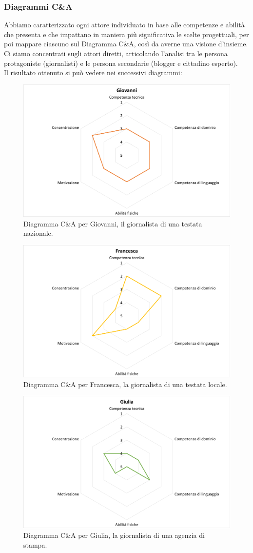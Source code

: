 \subsubsection{Diagrammi C\&A}
\label{sss:diagrammi-c_and_a}
Abbiamo caratterizzato ogni attore individuato in base alle competenze e abilità che presenta e che impattano in maniera più significativa le scelte progettuali, per poi mappare ciascuno sul Diagramma C\&A, così da averne una visione d'insieme.
Ci siamo concentrati sugli attori diretti, articolando l'analisi tra le persona protagoniste (giornalisti) e le persona secondarie (blogger e cittadino esperto).\\
Il risultato ottenuto si può vedere nei successivi diagrammi:
\begin{figure}[H]
    \centering
    \includegraphics[width=0.5\columnwidth]{assets/images/proposta-design/caos/giovanni}
    \caption{Diagramma C\&A per Giovanni, il giornalista di una testata nazionale.}
\end{figure}

\begin{figure}[H]
    \centering
    \includegraphics[width=0.5\columnwidth]{assets/images/proposta-design/caos/francesca}
    \caption{Diagramma C\&A per Francesca, la giornalista di una testata locale.}
\end{figure}

\begin{figure}[H]
    \centering
    \includegraphics[width=0.5\columnwidth]{assets/images/proposta-design/caos/giulia}
    \caption{Diagramma C\&A per Giulia, la giornalista di una agenzia di stampa.}
\end{figure}

